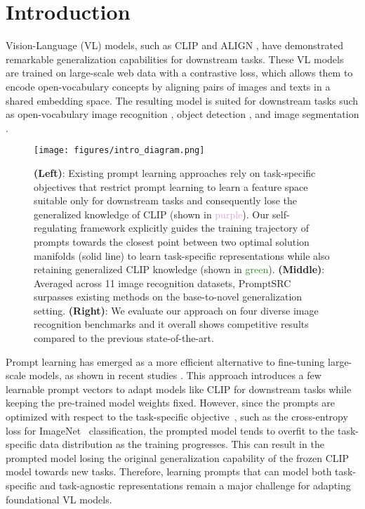 \documentclass[10pt,twocolumn,letterpaper]{article}
\newcommand{\txt}[1]{{\texttt{#1}}}
\newcommand\extrafootertext[1]{\bgroup
    \renewcommand\thefootnote{\fnsymbol{footnote}}\renewcommand\thempfootnote{\fnsymbol{mpfootnote}}\footnotetext[0]{#1}\egroup
}
\newcommand{\corrAuthor}{}
\begin{document}
\extrafootertext{\textsuperscript{*}Joint first authors.\\
\indent\indent \textsuperscript{\corrAuthor}\txt{uzair.khattak@mbzuai.ac.ae}}

\section{Introduction}
Vision-Language (VL) models, such as CLIP \cite{radford2021learning} and ALIGN \cite{jia2021scaling}, have demonstrated remarkable generalization capabilities for downstream tasks. These VL models are trained on large-scale web data with a contrastive loss, which allows them to encode open-vocabulary concepts by aligning pairs of images and texts in a shared embedding space. The resulting model is suited for downstream tasks such as open-vocabulary image recognition \cite{kim2022how}, object detection \cite{ feng2022promptdet}, and image segmentation \cite{luddecke2022image}.

\begin{figure*}[!ht]
\centering\vspace{-1em}
{\texttt{[image: figures/intro\_diagram.png]}}\vspace{-0.5em}
\caption{{\color{blue}\textbf{(Left)}}: Existing prompt learning approaches rely on task-specific objectives that restrict prompt learning to learn a feature space suitable only for downstream tasks and consequently lose the generalized knowledge of CLIP (shown in \textcolor{Plum}{purple}). Our self-regulating framework explicitly guides the training trajectory of prompts towards the closest point between two optimal solution manifolds (solid line) to learn task-specific representations while also retaining generalized CLIP knowledge (shown in \textcolor{ForestGreen}{green}). {\color{blue}\textbf{(Middle)}}: Averaged across 11 image recognition datasets, PromptSRC surpasses existing methods on the base-to-novel generalization setting. {\color{blue}\textbf{(Right)}}: We evaluate our approach on four diverse image recognition benchmarks and it {overall shows competitive results} compared to the previous state-of-the-art.}  
\label{fig:concept_figure}
\end{figure*}



Prompt learning has emerged as a more efficient alternative to fine-tuning large-scale models, as shown in recent studies \cite{zhou2022conditional,zhou2022learning, chen2022prompt, huang2022unsupervised, shu2022test, lu2022prompt}. 
This approach introduces a few learnable prompt vectors to adapt models like CLIP for downstream tasks while keeping the pre-trained model weights fixed.
However, since the prompts are optimized with respect to the task-specific objective~\cite{zhou2022learning}, such as the cross-entropy loss for ImageNet~\cite{deng2009imagenet} classification, the prompted model tends to overfit to the task-specific data distribution as the training progresses. This can result in the prompted model losing the original generalization capability of the frozen CLIP model towards new tasks. Therefore, learning prompts that can model both task-specific and task-agnostic representations remain a major challenge for adapting foundational VL models.
\end{document}
